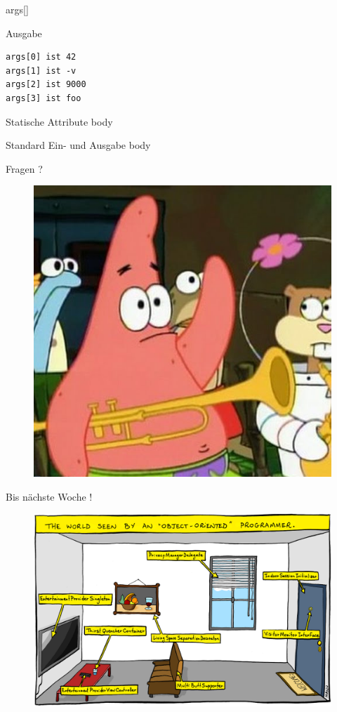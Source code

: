 \documentclass[18pt]{beamer}
\begin{document}
\begin{frame}[fragile]{args[]}

    \begin{exampleblock}{Ausgabe}
        \begin{lstlisting}
args[0] ist 42
args[1] ist -v
args[2] ist 9000
args[3] ist foo
        \end{lstlisting}
    \end{exampleblock}

\end{frame}


\begin{frame}{Statische Attribute}
    body
\end{frame}

\begin{frame}{Standard Ein- und Ausgabe}
    body
\end{frame}

\appendix
\beginbackup

\begin{frame}{Fragen ?}
    \begin{figure}
        \includegraphics[scale=0.3]{img/fragen.jpg}
    \end{figure}
\end{frame}

\begin{frame}{Bis nächste Woche !}
    \begin{figure}
        \includegraphics[scale=2]{img/oop.png}
    \end{figure}
\end{frame}

\backupend
\end{document}
